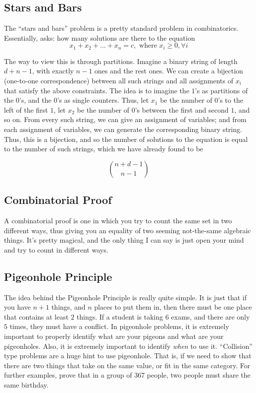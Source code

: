\documentclass[11pt]{article}
\begin{document}
\subsection{Stars and Bars}
	The ``stars and bars'' problem is a pretty standard problem in combinatorics.  Essentially, asks: how many solutions are there to the equation
	$$ x_1 + x_2 + \ldots + x_n = c , \textrm{ where } x_i \geq 0, \forall i $$
	
	The way to view this is through partitions.  Imagine a binary string of length $d + n -1$, with exactly $n-1$ ones and the rest ones.  We can create a bijection (one-to-one correspondence) 
	between all such strings and all assignments of $x_i$ that satisfy the above constraints. The idea is to imagine the $1$'s as partitions of the $0$'s, and the $0$'s as single counters.
	Thus, let $x_1$ be the number of $0$'s to the left of the first $1$, let $x_2$ be the number of $0$'s between the first and second $1$, and so on.  From every such string, we can 
	give an assignment of variables; and from each assignment of variables, we can generate the corresponding binary string.  Thus, this is a bijection, and so the number of
	solutions to the equation is equal to the number of such strings, which we have already found to be
	
	$$\binom{n+d-1}{n-1}$$
	
	
\subsection{Combinatorial Proof}
	A combinatorial proof is one in which you try to count the same set in two different ways, thus giving you an equality of two seeming not-the-same algebraic things.  It's pretty
	magical, and the only thing I can say is just open your mind and try to count in different ways.  
	
	
\subsection{Pigeonhole Principle}
	The idea behind the Pigeonhole Principle is really quite simple.  It is just that if you have $n+1$ things, and $n$ places to put them in, then there must be one place that contains
	at least $2$ things.  If a student is taking $6$ exams, and there are only $5$ times, they must have a conflict.  In pigeonhole problems, it is extremely important to properly identify
	what are your pigeons and what are your pigeonholes.  Also, it is extremely important to identify \emph{when} to use it.  ``Collision'' type problems are a huge hint to use pigeonhole.
	That is, if we need to show that there are two things that take on the same value, or fit in the same category.  For further examples, prove that in a group of 367 people, two people
	must share the same birthday. 
\end{document}

